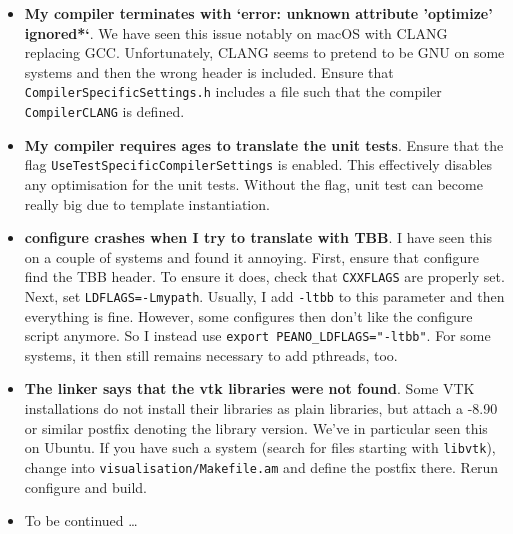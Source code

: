 \begin{itemize}
  \item \textbf{ My compiler terminates with `error: unknown
   attribute 'optimize' ignored*`}. We have seen this issue notably on macOS
   with CLANG replacing GCC. Unfortunately, CLANG seems to pretend to be GNU on
   some systems and then the wrong header is included. Ensure that
   \texttt{CompilerSpecificSettings.h} includes a file such that the compiler
   \linebreak
   \texttt{CompilerCLANG} is defined.
  \item \textbf{ My compiler requires ages to translate the unit tests}. Ensure
  that the flag \linebreak \texttt{UseTestSpecificCompilerSettings} is enabled.
  This effectively disables any optimisation for the unit tests. Without the
  flag, unit test can become really big due to template instantiation.
  \item \textbf{configure crashes when I try to translate with TBB}. I have seen
  this on a couple of systems and found it annoying. First, ensure that configure
  find the TBB header. To ensure it does, check that \texttt{CXXFLAGS} are properly
		set. Next, set \texttt{LDFLAGS=-Lmypath}. Usually, I add \texttt{-ltbb} to 
  this parameter and then everything is fine. However, some configures then don't 
  like the configure script anymore. So I instead use \texttt{export PEANO\_LDFLAGS="-ltbb"}. 
  For some systems, it then still remains necessary to add pthreads, too.
  \item \textbf{The linker says that the vtk libraries were not found}.
  Some VTK installations do not install their libraries as plain libraries, but 
  attach a -8.90 or similar postfix denoting the library version. We've in particular
  seen this on Ubuntu. If you have such a system (search for files starting with 
  \texttt{libvtk}), change into \texttt{visualisation/Makefile.am} and define the
  postfix there. Rerun configure and build.
  \item To be continued \dots
\end{itemize}



